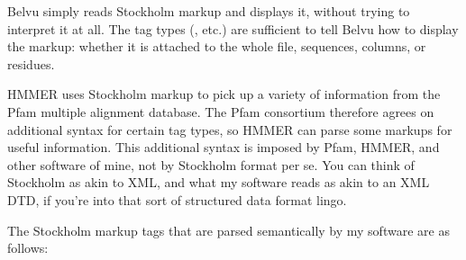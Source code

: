 Belvu simply reads Stockholm markup and displays it, without trying to
interpret it at all. The tag types (, etc.) are sufficient
to tell Belvu how to display the markup: whether it is attached to the
whole file, sequences, columns, or residues.

HMMER uses Stockholm markup to pick up a variety of information from
the Pfam multiple alignment database. The Pfam consortium therefore
agrees on additional syntax for certain tag types, so HMMER can parse
some markups for useful information. This additional syntax is imposed
by Pfam, HMMER, and other software of mine, not by Stockholm format
per se. You can think of Stockholm as akin to XML, and what my
software reads as akin to an XML DTD, if you're into that sort of
structured data format lingo.

The Stockholm markup tags that are parsed semantically by my software
are as follows:

